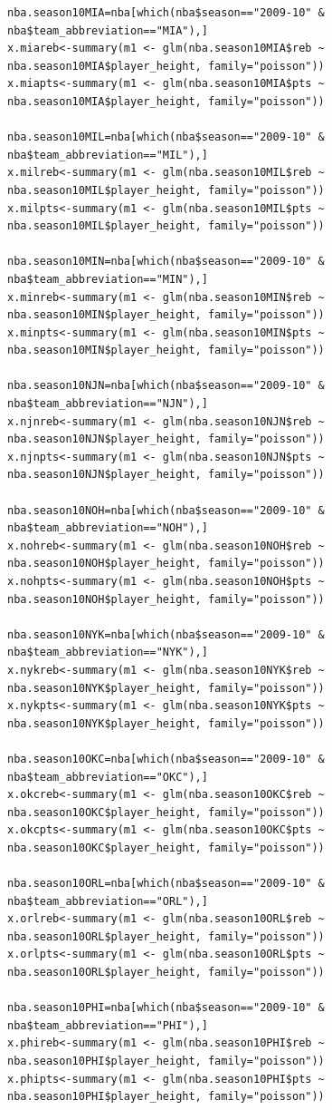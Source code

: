 \documentclass[11pt,letterpaper]{amsart}
\begin{document}
\begin{lstlisting}[breaklines]
nba.season10MIA=nba[which(nba$season=="2009-10" & nba$team_abbreviation=="MIA"),]
x.miareb<-summary(m1 <- glm(nba.season10MIA$reb ~ nba.season10MIA$player_height, family="poisson"))
x.miapts<-summary(m1 <- glm(nba.season10MIA$pts ~ nba.season10MIA$player_height, family="poisson"))

nba.season10MIL=nba[which(nba$season=="2009-10" & nba$team_abbreviation=="MIL"),]
x.milreb<-summary(m1 <- glm(nba.season10MIL$reb ~ nba.season10MIL$player_height, family="poisson"))
x.milpts<-summary(m1 <- glm(nba.season10MIL$pts ~ nba.season10MIL$player_height, family="poisson"))

nba.season10MIN=nba[which(nba$season=="2009-10" & nba$team_abbreviation=="MIN"),]
x.minreb<-summary(m1 <- glm(nba.season10MIN$reb ~ nba.season10MIN$player_height, family="poisson"))
x.minpts<-summary(m1 <- glm(nba.season10MIN$pts ~ nba.season10MIN$player_height, family="poisson"))

nba.season10NJN=nba[which(nba$season=="2009-10" & nba$team_abbreviation=="NJN"),]
x.njnreb<-summary(m1 <- glm(nba.season10NJN$reb ~ nba.season10NJN$player_height, family="poisson"))
x.njnpts<-summary(m1 <- glm(nba.season10NJN$pts ~ nba.season10NJN$player_height, family="poisson"))

nba.season10NOH=nba[which(nba$season=="2009-10" & nba$team_abbreviation=="NOH"),]
x.nohreb<-summary(m1 <- glm(nba.season10NOH$reb ~ nba.season10NOH$player_height, family="poisson"))
x.nohpts<-summary(m1 <- glm(nba.season10NOH$pts ~ nba.season10NOH$player_height, family="poisson"))

nba.season10NYK=nba[which(nba$season=="2009-10" & nba$team_abbreviation=="NYK"),]
x.nykreb<-summary(m1 <- glm(nba.season10NYK$reb ~ nba.season10NYK$player_height, family="poisson"))
x.nykpts<-summary(m1 <- glm(nba.season10NYK$pts ~ nba.season10NYK$player_height, family="poisson"))

nba.season10OKC=nba[which(nba$season=="2009-10" & nba$team_abbreviation=="OKC"),]
x.okcreb<-summary(m1 <- glm(nba.season10OKC$reb ~ nba.season10OKC$player_height, family="poisson"))
x.okcpts<-summary(m1 <- glm(nba.season10OKC$pts ~ nba.season10OKC$player_height, family="poisson"))

nba.season10ORL=nba[which(nba$season=="2009-10" & nba$team_abbreviation=="ORL"),]
x.orlreb<-summary(m1 <- glm(nba.season10ORL$reb ~ nba.season10ORL$player_height, family="poisson"))
x.orlpts<-summary(m1 <- glm(nba.season10ORL$pts ~ nba.season10ORL$player_height, family="poisson"))

nba.season10PHI=nba[which(nba$season=="2009-10" & nba$team_abbreviation=="PHI"),]
x.phireb<-summary(m1 <- glm(nba.season10PHI$reb ~ nba.season10PHI$player_height, family="poisson"))
x.phipts<-summary(m1 <- glm(nba.season10PHI$pts ~ nba.season10PHI$player_height, family="poisson"))


\end{lstlisting}
\end{document}
